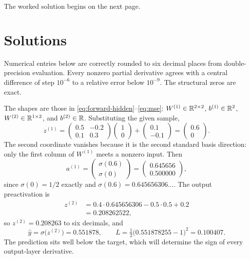 The worked solution begins on the next page.

\clearpage
\section{Solutions}

Numerical entries below are correctly rounded to six decimal places from double-precision evaluation. Every nonzero partial derivative agrees with a central difference of step \(10^{-6}\) to a relative error below \(10^{-9}\). The structural zeros are exact.


The shapes are those in \eqref{eq:forward-hidden}--\eqref{eq:mse}: \(W^{(1)}\in\mathbb{R}^{2\times 2}\), \(b^{(1)}\in\mathbb{R}^2\), \(W^{(2)}\in\mathbb{R}^{1\times 2}\), and \(b^{(2)}\in\mathbb{R}\). Substituting the given sample,
\[
  z^{(1)}
  =
  \begin{pmatrix} 0.5 & -0.2 \\ 0.1 & 0.3 \end{pmatrix}
  \begin{pmatrix} 1 \\ 0 \end{pmatrix}
  +
  \begin{pmatrix} 0.1 \\ -0.1 \end{pmatrix}
  =
  \begin{pmatrix} 0.6 \\ 0 \end{pmatrix}.
\]
The second coordinate vanishes because it is the second standard basis direction: only the first column of \(W^{(1)}\) meets a nonzero input. Then
\[
  a^{(1)}
  =
  \begin{pmatrix} \sigma(0.6) \\ \sigma(0) \end{pmatrix}
  =
  \begin{pmatrix} 0.645656 \\ 0.500000 \end{pmatrix},
\]
since \(\sigma(0) = 1/2\) exactly and \(\sigma(0.6) = 0.645656306\ldots\). The output preactivation is
\begin{align*}
  z^{(2)}
  &= 0.4\cdot 0.645656306 - 0.5\cdot 0.5 + 0.2 \\
  &= 0.208262522,
\end{align*}
so \(z^{(2)} = 0.208263\) to six decimals, and
\[
  \hat y = \sigma\bigl(z^{(2)}\bigr) = 0.551878,
  \qquad
  L = \tfrac12\bigl(0.551878255 - 1\bigr)^2 = 0.100407.
\]
The prediction sits well below the target, which will determine the sign of every output-layer derivative.

